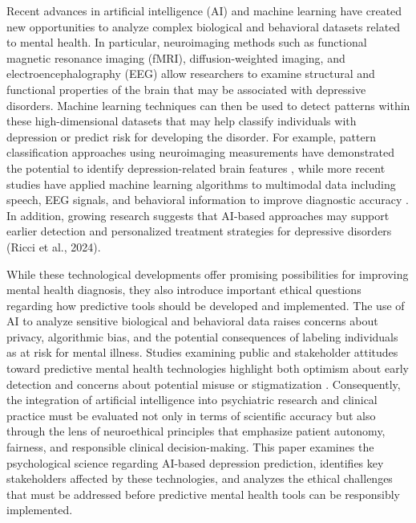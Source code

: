 \documentclass[12pt]{article}
\begin{document}
Recent advances in artificial intelligence (AI) and machine learning have created new opportunities to analyze complex biological and behavioral datasets related to mental health. In particular, neuroimaging methods such as functional magnetic resonance imaging (fMRI), diffusion-weighted imaging, and electroencephalography (EEG) allow researchers to examine structural and functional properties of the brain that may be associated with depressive disorders. Machine learning techniques can then be used to detect patterns within these high-dimensional datasets that may help classify individuals with depression or predict risk for developing the disorder. For example, pattern classification approaches using neuroimaging measurements have demonstrated the potential to identify depression-related brain features \citep{wu2015}, while more recent studies have applied machine learning algorithms to multimodal data including speech, EEG signals, and behavioral information to improve diagnostic accuracy \citep{ahire2025, liu2025, weber2025}. In addition, growing research suggests that AI-based approaches may support earlier detection and personalized treatment strategies for depressive disorders (Ricci et al., 2024).

While these technological developments offer promising possibilities for improving mental health diagnosis, they also introduce important ethical questions regarding how predictive tools should be developed and implemented. The use of AI to analyze sensitive biological and behavioral data raises concerns about privacy, algorithmic bias, and the potential consequences of labeling individuals as at risk for mental illness. Studies examining public and stakeholder attitudes toward predictive mental health technologies highlight both optimism about early detection and concerns about potential misuse or stigmatization \citep{kohrt2025}. Consequently, the integration of artificial intelligence into psychiatric research and clinical practice must be evaluated not only in terms of scientific accuracy but also through the lens of neuroethical principles that emphasize patient autonomy, fairness, and responsible clinical decision-making. This paper examines the psychological science regarding AI-based depression prediction, identifies key stakeholders affected by these technologies, and analyzes the ethical challenges that must be addressed before predictive mental health tools can be responsibly implemented.

\newpage
\end{document}

